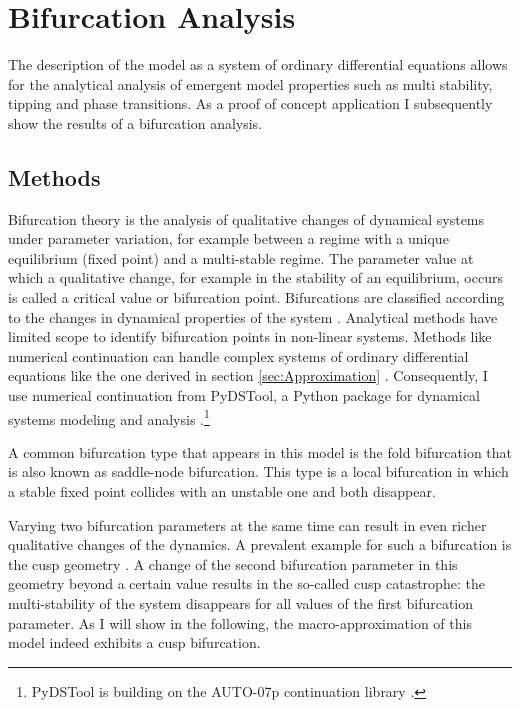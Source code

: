 \section{Bifurcation Analysis}
\label{sec:bifurcation-analysis}

The description of the model as a system of ordinary differential equations allows for the analytical analysis of emergent model properties such as multi stability, tipping and phase transitions. 
As a proof of concept application I subsequently show the results of a bifurcation analysis.

\subsection{Methods}
Bifurcation theory is the analysis of qualitative changes of dynamical systems under parameter variation, for example between a regime with a unique equilibrium (fixed point) and a multi-stable regime.
The parameter value at which a qualitative change, for example in the stability of an equilibrium, occurs is called a critical value or bifurcation point. Bifurcations are classified according to the changes in dynamical properties of the system \cite{Strogatz1994,Kuznetsov1998}.
Analytical methods have limited scope to identify bifurcation points in non-linear systems. Methods like numerical continuation can handle complex systems of ordinary differential equations like the one derived in section \ref{sec:Approximation} \citep{Allgower2003}.
Consequently, I use numerical continuation from PyDSTool, a Python package for dynamical systems modeling and analysis \citep{pydstool,10.1371/journal.pcbi.1002628}.\footnote{PyDSTool is building on the AUTO-07p continuation library \citep{Doedel07auto-07p:continuation}.}

A common bifurcation type that appears in this model is the fold bifurcation that is also known as saddle-node bifurcation. This type is a local bifurcation in which a stable fixed point collides with an unstable one and both disappear. 

Varying two bifurcation parameters at the same time can result in even richer qualitative changes of the dynamics. A prevalent example for such a bifurcation is the cusp geometry \citep[][p.\.397]{Kuznetsov1998}. A change of the second bifurcation parameter in this geometry beyond a certain value results in the so-called cusp catastrophe: the multi-stability of the system disappears for all values of the first bifurcation parameter. As I will show in the following, the macro-approximation of this model indeed exhibits a cusp bifurcation. 

